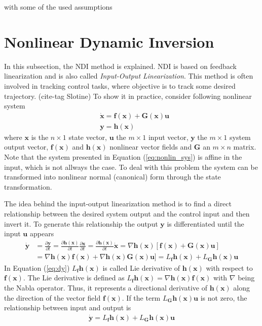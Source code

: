\documentclass[11pt, a4paper, twoside]{report}
\begin{document}
with some of the used assumptions

\section{Nonlinear Dynamic Inversion} \label{sec:ndi}

In this subsection, the \acrfull{NDI} method is explained. \acrshort{NDI} is based on feedback linearization and is also called \textit{Input-Output Linearization}. This method is often involved in tracking control tasks, where objective is to track some desired trajectory. (cite-tag Slotine) To show it in practice, consider following nonlinear system
\begin{subequations}
	\begin{align}
		&\bm{\dot{x}} = \bm{f(x)} + \bm{G(x)}\bm{u} \\
		&\bm{y} = \bm{h(x)}
		\label{eq:nonlin_sys}
	\end{align}
\end{subequations}
where $\bm{x}$ is the $n\times1$ state vector, $\bm{u}$ the $m\times1$ input vector, $\bm{y}$ the $m\times1$ system output vector, $\bm{f(x)}$ and $\bm{h(x)}$ nonlinear vector fields and $\bm{G}$ an $m\times n$ matrix. Note that the system presented in Equation (\ref{eq:nonlin_sys}) is affine in the input, which is not allways the case. To deal with this problem the system can be transformed into nonlinear normal (canonical) form through the state transformation.

The idea behind the input-output linearization method is to find a direct relationship between the desired system output and the control input and then invert it. To generate this relationship the output $\bm{y}$ is differentiated until the input $\bm{u}$ appears
\begin{equation}
	\begin{split}
		\dot{\bm{y}} &=  \frac{\partial\bm{y}}{\partial t} = \frac{\partial\bm{h(x)}}{\partial t} \frac{\partial\bm{x}}{\partial t} = \frac{\partial\bm{h(x)}}{\partial t} \dot{\bm{x}} = \nabla\bm{h(x)} [\bm{f(x)} + \bm{G(x)}\bm{u}] \\
		&= \nabla\bm{h(x)} \bm{f(x)} + \nabla\bm{h(x)} \bm{G(x)}\bm{u}] = L_{\bm{f}} \bm{h(x)} + L_{\bm{G}} \bm{h(x) u} 
		\label{eq:dy}
	\end{split}
\end{equation}
In Equation (\ref{eq:dy}) $L_{\bm{f}} \bm{h(x)}$ is called Lie derivative of $\bm{h(x)}$ with respect to $\bm{f(x)}$. The Lie derivative is defined as $L_{\bm{f}} \bm{h(x)} = \nabla\bm{h(x)} \bm{f(x)}$ with $\nabla$ being the Nabla operator. Thus, it represents a directional derivative of $\bm{h(x)}$ along the direction of the vector field $\bm{f(x)}$. If the term $L_{\bm{G}} \bm{h(x) u}$ is not zero, the relationship between input and output is
\begin{equation}
	\begin{split}
		\dot{\bm{y}} = L_{\bm{f}} \bm{h(x)} + L_{\bm{G}} \bm{h(x) u} 
		\label{eq:dy_u_rel}
	\end{split}
\end{equation}
\end{document}
